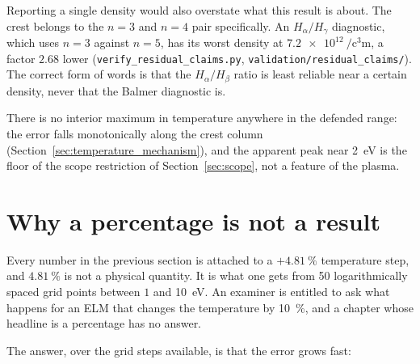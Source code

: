 Reporting a single density would also overstate what this result is about. The
crest belongs to the $n=3$ and $n=4$ pair specifically. An
$H_\alpha/H_\gamma$ diagnostic, which uses $n=3$ against $n=5$, has its worst
density at $\SI{7.2e12}{\per\cubic\centi\metre}$, a factor $2.68$ lower
(\texttt{verify\_residual\_claims.py}, \texttt{validation/residual\_claims/}). The correct form of words is that the
$H_\alpha/H_\beta$ ratio is least reliable near a certain density, never that
the Balmer diagnostic is.

There is no interior maximum in temperature anywhere in the defended range: the
error falls monotonically along the crest column
(Section~\ref{sec:temperature_mechanism}), and the apparent peak near
\SI{2}{\electronvolt} is the floor of the scope restriction of
Section~\ref{sec:scope}, not a feature of the plasma.

\section{Why a percentage is not a result}
\label{sec:step_convention}

Every number in the previous section is attached to a $+\SI{4.81}{\percent}$
temperature step, and $\SI{4.81}{\percent}$ is not a physical quantity. It is
what one gets from 50 logarithmically spaced grid points between $1$ and
\SI{10}{\electronvolt}. An examiner is entitled to ask what happens for an ELM
that changes the temperature by \SI{10}{\percent}, and a chapter whose headline
is a percentage has no answer.

The answer, over the grid steps available, is that the error grows fast:

